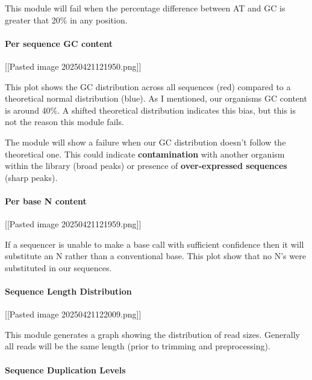 This module will fail when the percentage difference between AT and GC
is greater that 20\% in any position.

\hypertarget{per-sequence-gc-content}{%
\paragraph{Per sequence GC content}\label{per-sequence-gc-content}}

{[}{[}Pasted image 20250421121950.png{]}{]}

This plot shows the GC distribution across all sequences (red) compared
to a theoretical normal distribution (blue). As I mentioned, our
organisms GC content is around 40\%. A shifted theoretical distribution
indicates this bias, but this is not the reason this module fails.

The module will show a failure when our GC distribution doesn't follow
the theoretical one. This could indicate \textbf{contamination} with
another organism within the library (broad peaks) or presence of
\textbf{over-expressed sequences} (sharp peaks).

\hypertarget{per-base-n-content}{%
\paragraph{Per base N content}\label{per-base-n-content}}

{[}{[}Pasted image 20250421121959.png{]}{]}

If a sequencer is unable to make a base call with sufficient confidence
then it will substitute an N rather than a conventional base. This plot
show that no N's were substituted in our sequences.

\hypertarget{sequence-length-distribution}{%
\paragraph{Sequence Length
Distribution}\label{sequence-length-distribution}}

{[}{[}Pasted image 20250421122009.png{]}{]}

This module generates a graph showing the distribution of read sizes.
Generally all reads will be the same length (prior to trimming and
preprocessing).

\hypertarget{sequence-duplication-levels}{%
\paragraph{Sequence Duplication
Levels}\label{sequence-duplication-levels}}

